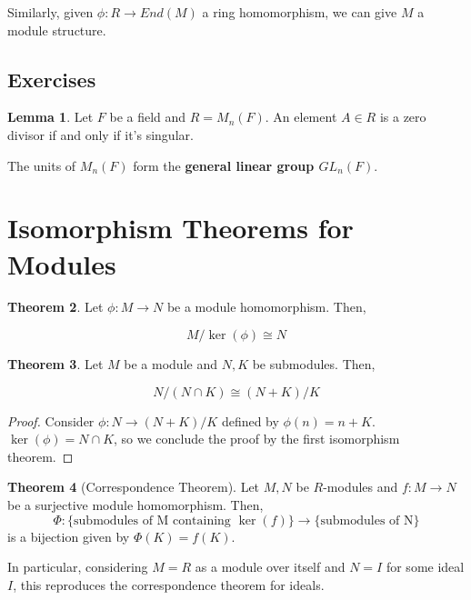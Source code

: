 \documentclass{article}
\theoremstyle{definition}
\newtheorem{theorem}{Theorem}[section]
\newtheorem{lemma}[theorem]{Lemma}
\begin{document}
Similarly, given $\phi: R \xrightarrow{} End(M)$ a ring homomorphism, we can give $M$ a module structure.

\newpage

\subsection{Exercises}

\begin{lemma}
    Let $F$ be a field and $R = M_{n}(F)$. An element $A \in R$ is a zero divisor if and only if
    it's singular.
\end{lemma}

The units of $M_{n}(F)$ form the \textbf{general linear group $GL_{n}(F)$}.

\newpage

\section{Isomorphism Theorems for Modules}

\begin{theorem}
    Let $\phi: M \xrightarrow{} N$ be a module homomorphism. Then,

    \[ M/\ker(\phi) \cong N \]
\end{theorem}

\begin{theorem}
    Let $M$ be a module and $N,K$ be submodules. Then,

    \[ N/(N \cap K) \cong (N + K)/ K\]
\end{theorem}
\begin{proof}
    Consider $\phi: N \xrightarrow{} (N + K)/K$ defined by $\phi(n) = n + K$.
    $\ker(\phi) = N \cap K$, so we conclude the proof by the first isomorphism
    theorem.
\end{proof}

\begin{theorem}[Correspondence Theorem]
    Let $M,N$ be $R$-modules and $f: M \xrightarrow{} N$ be a surjective module homomorphism.
    Then, \[\Phi: \{ \text{submodules of M containing $\ker(f)$}\} \xrightarrow{} \{ \text{submodules of N}\} \]
    is a bijection given by $\Phi(K) = f(K)$.
\end{theorem}

In particular, considering $M = R$ as a module over itself and $N = I$ for some ideal $I$, 
this reproduces the correspondence theorem for ideals.

\newpage
\end{document}
